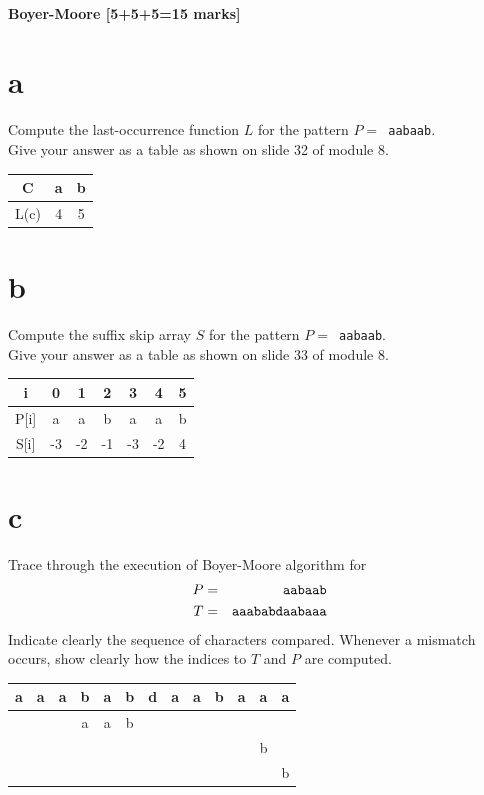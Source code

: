 \documentclass[12pt]{article}
\begin{document}
\subsection{Boyer-Moore [5+5+5=15 marks]}
\begin{itemize}
\part{a}
Compute the last-occurrence function $L$ for the pattern $P =$\texttt{~aabaab}.\\ Give your answer as a table as shown on slide 32 of module 8.
\begin{center}
  \begin{tabular}{c | c | c}
    C & a & b\\
    \hline
    L(c) & 4 & 5\\
  \end{tabular}
\end{center}
\part{b}
Compute the suffix skip array $S$ for the pattern $P =$\texttt{~aabaab}. \\Give your answer as a table as shown on slide 33 of module 8.
\begin{center}
  \begin{tabular}{c|c|c|c|c|c|c}
    i & 0 & 1 & 2 & 3 & 4 & 5\\
    \hline
    P[i] & a & a & b & a & a & b\\
    S[i] & -3 & -2 & -1 & -3 & -2 & 4
  \end{tabular}
\end{center}

\part{c} Trace through the execution of Boyer-Moore algorithm for
\begin{align*}
P &=& \tt{aabaab}\\
T &=& \tt{aaababdaabaaa}
\end{align*}
Indicate clearly the sequence of characters compared. Whenever a mismatch occurs, show clearly how the indices to $T$ and $P$ are computed.
\begin{center}
  \begin{tabular}{|c|c|c|c|c|c|c|c|c|c|c|c|c|}
  \hline
  \textbf{a} &\textbf{a} &\textbf{a} &\textbf{b} &\textbf{a} &\textbf{b} &\textbf{d} &\textbf{a} &\textbf{a} &\textbf{b} &\textbf{a} &\textbf{a} & \textbf{a}\\
  \hline
   &&&a&a&b&&&&&&&\\
  \hline
   &&&&&&&&&&&b&\\
  \hline
   &&&&&&&&&&&&b\\
  \hline
  \end{tabular}
\end{center}
\end{itemize}
\end{document}
